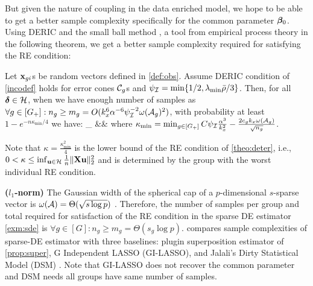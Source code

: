 But given the nature of coupling in the data enriched model, we hope to be able to get a better sample complexity specifically for the common parameter $\boldsymbol{\beta}_0$.
Using DERIC and the small ball method \cite{mend15}, a tool from empirical process theory in the following theorem, we get a better sample complexity required for satisfying the RE condition:
\begin{theorem}
	\label{theo:re}
	Let $\mathbf{x}_{gi}$s	be random vectors defined in \cref{def:obs}.
	Assume DERIC condition of \cref{incodef} holds for error cones $\cC_g$s and $\rinc=\min\{1/2, \lamin\ratio/3\}$.
	Then, for all $\ddelta \in \cH$, when we have enough number of samples as $\forall g \in [G_+]: n_g \geq m_g = O(k_x^6 \alpha^{-6} \rinc^{-2} \omega(\cA_g)^2)$, with probability at least $1 - e^{-n \kappa_{\min}/4}$  we have:
	\be
	\nr
	\inf_{\ddelta \in \cH}   &\geq& 
	\ee
	where $\kappa_{\min} = \min_{g\in [G_+]} C \rinc \frac{\alpha^3}{k_x^2}  - \frac{2 c_g k_x \omega(\cA_g)}{\sqrt{n_g}}$. 
\end{theorem}

\begin{remark}
	Note that $\kappa = \frac{\kappa_{\min}^2}{4}$ is the lower bound of the RE condition of \cref{theo:deter}, i.e., $0 < \kappa \leq \inf_{\u \in \cH} \frac{1}{n} \norm{\X \u}{2}^2$ and is determined by the group with the worst individual RE condition. 
\end{remark}

\begin{example}
	{\bf ($l_1$-norm)} The Gaussian width of the spherical cap of a $p$-dimensional $s$-sparse vector is $\omega(\cA) = \Theta(\sqrt{s\log p})$ \cite{banerjee14, vershynin2018high}. Therefore, the number of samples per group and total required for satisfaction of the RE condition in the sparse DE estimator \cref{exm:sde} is $\forall g \in [G]: n_g \geq m_g = \Theta(s_g \log p)$. 
	 compares sample complexities of sparse-DE estimator with three baselines: plugin superposition estimator of \cref{prop:super}, G Independent LASSO (GI-LASSO), and Jalali's Dirty Statistical Model (DSM) \cite{jrsr10}. Note that GI-LASSO does not recover the common parameter and DSM needs all groups have same number of samples. 
\end{example}

